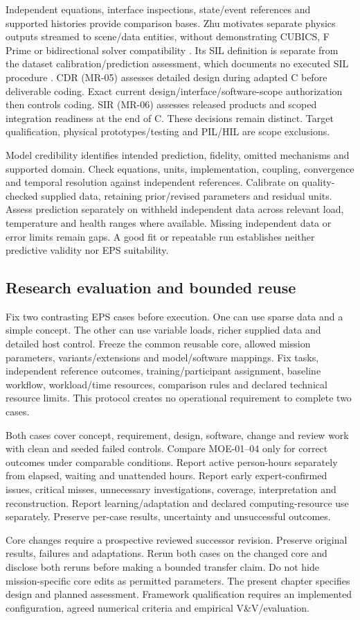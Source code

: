 Independent equations, interface inspections, state/event references and supported histories provide comparison bases. Zhu motivates separate physics outputs streamed to scene/data entities, without demonstrating CUBICS, F Prime or bidirectional solver compatibility \citep[pp.~4--5, 7--8]{handpicked-0001}. Its SIL definition is separate from the dataset calibration/prediction assessment, which documents no executed SIL procedure \citep[p.~3 and pp.~7--9]{handpicked-0001}. CDR (MR-05) assesses detailed design during adapted C before deliverable coding. Exact current design/interface/software-scope authorization then controls coding. SIR (MR-06) assesses released products and scoped integration readiness at the end of C. These decisions remain distinct. Target qualification, physical prototypes/testing and PIL/HIL are scope exclusions.

Model credibility identifies intended prediction, fidelity, omitted mechanisms and supported domain. Check equations, units, implementation, coupling, convergence and temporal resolution against independent references. Calibrate on quality-checked supplied data, retaining prior/revised parameters and residual units. Assess prediction separately on withheld independent data across relevant load, temperature and health ranges where available. Missing independent data or error limits remain gaps. A good fit or repeatable run establishes neither predictive validity nor EPS suitability.

\subsection{Research evaluation and bounded reuse}

Fix two contrasting EPS cases before execution. One can use sparse data and a simple concept. The other can use variable loads, richer supplied data and detailed host control. Freeze the common reusable core, allowed mission parameters, variants/extensions and model/software mappings. Fix tasks, independent reference outcomes, training/participant assignment, baseline workflow, workload/time resources, comparison rules and declared technical resource limits. This protocol creates no operational requirement to complete two cases.

Both cases cover concept, requirement, design, software, change and review work with clean and seeded failed controls. Compare MOE-01--04 only for correct outcomes under comparable conditions. Report active person-hours separately from elapsed, waiting and unattended hours. Report early expert-confirmed issues, critical misses, unnecessary investigations, coverage, interpretation and reconstruction. Report learning/adaptation and declared computing-resource use separately. Preserve per-case results, uncertainty and unsuccessful outcomes.

Core changes require a prospective reviewed successor revision. Preserve original results, failures and adaptations. Rerun both cases on the changed core and disclose both reruns before making a bounded transfer claim. Do not hide mission-specific core edits as permitted parameters. The present chapter specifies design and planned assessment. Framework qualification requires an implemented configuration, agreed numerical criteria and empirical V\&V/evaluation.
